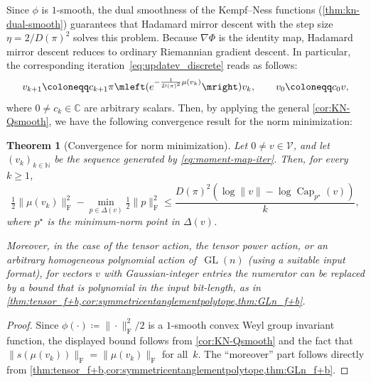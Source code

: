 \documentclass[11pt,letterpaper]{article}
\newtheorem{theorem}{Theorem}[section]
\numberwithin{equation}{section}
\newcommand{\CC}{\mathbb{C}}
\newcommand{\NN}{\mathbb{N}}
\newcommand{\VV}{\mathcal{V}}
\DeclareMathOperator{\Capacity}{Cap}
\DeclareMathOperator{\GL}{GL}
\begin{document}
Since $\phi$ is $1$-smooth, the dual smoothness of the Kempf--Ness functions (\cref{thm:kn-dual-smooth}) guarantees that Hadamard mirror descent with the step size $\eta = 2/D(\pi)^2$ solves this problem.
Because $\nabla\Phi$ is the identity map, Hadamard mirror descent reduces to ordinary Riemannian gradient descent.
In particular, the corresponding iteration~\eqref{eq:updatev_discrete} reads as follows:
\begin{equation}\label{eq:moment-map-iter}
    v_{k+1} \coloneqq c_{k+1}\pi\mleft(e^{-\frac1{D(\pi)^2}\mu(v_k)}\mright)v_k,\qquad v_0 \coloneqq c_0v,
\end{equation}
where $0 \neq c_k \in \CC$ are arbitrary scalars.
Then, by applying the general \cref{cor:KN-Qsmooth}, we have the following convergence result for the norm minimization:

\begin{theorem}[Convergence for norm minimization]\label{thm:moment-norm-conv}
    Let $0 \neq v \in \VV$, and let $(v_k)_{k \in \NN}$ be the sequence generated by \cref{eq:moment-map-iter}.
    Then, for every $k\geq1$,
    \[
        \tfrac12\|\mu(v_k)\|_{\mathrm{F}}^2 - \min_{p \in \Delta(v)}\tfrac12\|p\|_{\mathrm{F}}^2
    \leq \frac{D(\pi)^2 \left( \log\|v\| - \log\Capacity_{p^\star}(v) \right)}{k},
    \]
    where $p^\star$ is the minimum-norm point in $\Delta(v)$.

    Moreover, in the case of the tensor action, the tensor power action, or an arbitrary homogeneous polynomial action of~$\GL(n)$ (using a suitable input format), for vectors $v$ with Gaussian-integer entries the numerator can be replaced by a bound that is polynomial in the input bit-length, as in \cref{thm:tensor_f+b,cor:symmetricentanglementpolytope,thm:GLn_f+b}.
\end{theorem}
\begin{proof}
    Since $\phi(\cdot) \coloneqq \|\cdot\|_{\mathrm{F}}^2/2$ is a $1$-smooth convex Weyl group invariant function, the displayed bound follows from \cref{cor:KN-Qsmooth} and the fact that $\|s(\mu(v_k))\|_{\mathrm{F}} = \|\mu(v_k)\|_{\mathrm{F}}$ for all~$k$.
    The ``moreover'' part follows directly from \cref{thm:tensor_f+b,cor:symmetricentanglementpolytope,thm:GLn_f+b}.
\end{proof}
\end{document}
